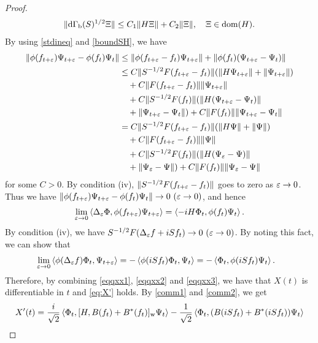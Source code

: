 \documentclass[12pt]{article}
\theoremstyle{plain}
\numberwithin{equation}{section}
\theoremstyle{remark}
\begin{document}
\begin{proof}
\begin{align}
  \| \mathrm{d\Gamma_b}(S)^{1/2}\Xi \| \leq C_1\| H\Xi \|+C_2\| \Xi \|, \quad \Xi\in\mathop{\mathrm{dom}}(H).
 \label{boundSH}
\end{align}
By using \eqref{stdineq} and \eqref{boundSH}, we have
\begin{align*}
\| \phi(f_{t+\varepsilon})\Psi_{t+\varepsilon} - \phi(f_t)\Psi_t \| 
&\leq \| \phi(f_{t+\varepsilon}-f_t) \Psi_{t+\varepsilon} \| + \| \phi(f_t) (\Psi_{t+\varepsilon}-\Psi_t) \|\\
&\leq C\| S^{-1/2}F(f_{t+\varepsilon}-f_t) \| (\| H\Psi_{t+\varepsilon} \| + \| \Psi_{t+\varepsilon} \|)\\
  & \quad + C\| F(f_{t+\varepsilon}-f_t) \| \| \Psi_{t+\varepsilon} \| \\
&\quad  + C\| S^{-1/2}F(f_t) \| (\| H(\Psi_{t+\varepsilon}-\Psi_t) \| \\
& \quad + \| \Psi_{t+\varepsilon}-\Psi_t \|) + C\| F(f_t) \| \| \Psi_{t+\varepsilon}-\Psi_t \|  \\
&= C\| S^{-1/2}F(f_{t+\varepsilon}-f_t) \| (\| H\Psi \| + \| \Psi \|)\\
  & \quad + C\| F(f_{t+\varepsilon}-f_t) \| \| \Psi \| \\
&\quad  + C\| S^{-1/2}F(f_t) \| (\| H(\Psi_\varepsilon-\Psi) \| \\
& \quad + \| \Psi_\varepsilon-\Psi \|)
  + C\| F(f_t) \| \| \Psi_\varepsilon-\Psi \|
\end{align*}
for some $C>0$.
By condition (iv), $\| S^{-1/2}F(f_{t+\varepsilon}-f_t) \|$ goes to zero as $\varepsilon\to 0$.
Thus we have $\| \phi(f_{t+\varepsilon})\Psi_{t+\varepsilon} - \phi(f_t)\Psi_t \|\to 0\ (\varepsilon \to 0)$, and hence
\begin{align}
  \lim_{\varepsilon\to 0}  \left\langle\Delta_\varepsilon\Phi,\phi(f_{t+\varepsilon})\Psi_{t+\varepsilon}\right\rangle
 = \left\langle-iH\Phi_t,\phi(f_t)\Psi_t\right\rangle. \label{eqqxx2}
\end{align}
By condition (iv), we have $S^{-1/2}F(\Delta_\varepsilon f+iSf_t)\to 0\ (\varepsilon\to 0)$.
By noting this fact, we can show that 
\begin{align}
&\lim_{\varepsilon\to 0} \left\langle\phi(\Delta_\varepsilon f)\Phi_t,\Psi_{t+\varepsilon}\right\rangle
 = -\left\langle\phi(iSf_t)\Phi_t,\Psi_t\right\rangle
 = -\left\langle\Phi_t,\phi(iSf_t)\Psi_t\right\rangle. \label{eqqxx3}
\end{align}
Therefore, by combining \eqref{eqqxx1}, \eqref{eqqxx2} and \eqref{eqqxx3}, 
we have that $X(t)$ is differentiable in $t$ and \eqref{eq:X'} holds.
By \eqref{comm1} and \eqref{comm2}, we get 
\begin{align*}
X'(t) 
&= \frac{i}{\sqrt{2}}\inner{\Phi_t}{[H,B(f_t)+B^*(f_t)]_\mathrm{w}\Psi_t}
  -\frac{1}{\sqrt{2}}\inner{\Phi_t}{(B(iSf_t)+B^*(iSf_t))\Psi_t} \\

\end{align*}
\end{proof}
\end{document}
